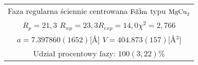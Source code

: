 \documentclass[a4paper,12pt]{article}
\numberwithin{equation}{section}
\newcommand{\nit}[1]{\textnormal{#1}}
\begin{document}
\begin{appendices}
\begin{longtable}[c]{|c|c|c|c|c|c|c|}
    \multicolumn{7}{|c|}{ Faza regularna ściennie centrowana $\nit{Fd}\bar{3}\nit{m}$ typu $\nit{MgCu}_2$ }\\
    \multicolumn{7}{|c|}{ $R_p=21,3$ \hspace{0.4cm}$R_{wp}=23,3$\hspace{0.4cm}$R_{exp}=14,0$\hspace{0.4cm}$\chi^2=2,766$  }\\
    \multicolumn{7}{|c|}{ $a=7.397860(1652) [$\AA$]$ \hspace{0.4cm}$V=404.873(157)[$\AA$^3]$ }\\
    \multicolumn{7}{|c|}{ Udział procentowy fazy: $100(3,22)\%$ }\\\hline

 \end{longtable}




\end{appendices}
\end{document}
